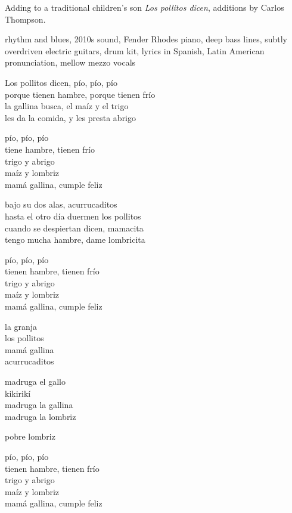 
\begin{notes}
Adding to a traditional children's son \emph{Los pollitos dicen}, additions by Carlos Thompson.
\end{notes}
\begin{style}
rhythm and blues, 2010s sound, Fender Rhodes piano, deep bass lines, subtly overdriven electric guitars, drum kit, lyrics in Spanish, Latin American pronunciation, mellow mezzo vocals
\end{style}
\begin{lyrics}


Los pollitos dicen, pío, pío, pío\\
porque tienen hambre, porque tienen frío\\
la gallina busca, el maíz y el trigo\\
les da la comida, y les presta abrigo

pío, pío, pío\\
tiene hambre, tienen frío\\
trigo y abrigo\\
maíz y lombriz\\
mamá gallina, cumple feliz

bajo su dos alas, acurrucaditos\\
hasta el otro día duermen los pollitos\\
cuando se despiertan dicen, mamacita\\
tengo mucha hambre, dame lombricita

pío, pío, pío\\
tienen hambre, tienen frío\\
trigo y abrigo\\
maíz y lombriz\\
mamá gallina, cumple feliz

la granja\\
los pollitos\\
mamá gallina\\
acurrucaditos

madruga el gallo\\
kikirikí\\
madruga la gallina\\
madruga la lombriz

pobre lombriz

pío, pío, pío\\
tienen hambre, tienen frío\\
trigo y abrigo\\
maíz y lombriz\\
mamá gallina, cumple feliz
\end{lyrics}

